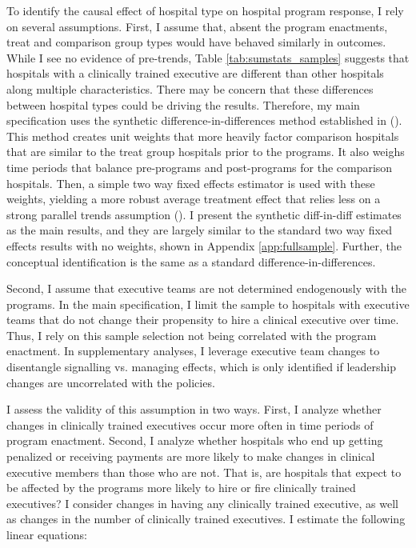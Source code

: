 \documentclass[12pt]{article}
\begin{document}
    To identify the causal effect of hospital type on hospital program response, I rely on several assumptions. First, I assume that, absent the program enactments, treat and comparison group types would have behaved similarly in outcomes. While I see no evidence of pre-trends, Table \ref{tab:sumstats_samples} suggests that hospitals with a clinically trained executive are different than other hospitals along multiple characteristics. There may be concern that these differences between hospital types could be driving the results. Therefore, my main specification uses the synthetic difference-in-differences method established in \citeauthor{arkhangelsky2021synthetic} (\citeyear{arkhangelsky2021synthetic}). This method creates unit weights that more heavily factor comparison hospitals that are similar to the treat group hospitals prior to the programs. It also weighs time periods that balance pre-programs and post-programs for the comparison hospitals. Then, a simple two way fixed effects estimator is used with these weights, yielding a more robust average treatment effect that relies less on a strong parallel trends assumption (\cite{arkhangelsky2021synthetic}). I present the synthetic diff-in-diff estimates as the main results, and they are largely similar to the standard two way fixed effects results with no weights, shown in Appendix \ref{app:fullsample}. Further, the conceptual identification is the same as a standard difference-in-differences.

     Second, I assume that executive teams are not determined endogenously with the programs. In the main specification, I limit the sample to hospitals with executive teams that do not change their propensity to hire a clinical executive over time. Thus, I rely on this sample selection not being correlated with the program enactment. In supplementary analyses, I leverage executive team changes to disentangle signalling vs. managing effects, which is only identified if leadership changes are uncorrelated with the policies. 

     I assess the validity of this assumption in two ways. First, I analyze whether changes in clinically trained executives occur more often in time periods of program enactment. Second, I analyze whether hospitals who end up getting penalized or receiving payments are more likely to make changes in clinical executive members than those who are not. That is, are hospitals that expect to be affected by the programs more likely to hire or fire clinically trained executives? I consider changes in having any clinically trained executive, as well as changes in the number of clinically trained executives. I estimate the following linear equations:
\end{document}
